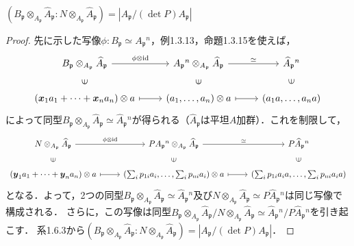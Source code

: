 \begin{screen}
  $(B_\mathfrak{p}\otimes_{A_\mathfrak{p}}\widehat{A}_\mathfrak{p}:N\otimes_{A_\mathfrak{p}}\widehat{A}_\mathfrak{p}) = |A_\mathfrak{p}/(\det P)A_\mathfrak{p}|$
\end{screen}
\begin{proof}
  先に示した写像$\phi\colon B_\mathfrak{p}\simeq A_\mathfrak{p}{}^n$，例1.3.13，命題1.3.15を使えば，
  \[
  \begin{tikzcd}
    B_\mathfrak{p}\otimes_{A_\mathfrak{p}}\widehat{A}_\mathfrak{p} \arrow[r, "\phi\otimes\id"]\arrow[d, phantom, "\ni" sloped] & A_\mathfrak{p}{}^n\otimes_{A_\mathfrak{p}}\widehat{A}_\mathfrak{p} \arrow[r, "\simeq"]\arrow[d, phantom, "\ni" sloped] & \widehat{A}_\mathfrak{p}{}^n \arrow[d, phantom, "\ni" sloped] \\
    (\boldsymbol{x}_1a_1 + \cdots + \boldsymbol{x}_na_n)\otimes a \arrow[r, mapsto] & (a_1, \ldots, a_n)\otimes a \arrow[r, mapsto] & (a_1a, \ldots, a_na)
  \end{tikzcd}
  \]
  によって同型$B_\mathfrak{p}\otimes_{A_\mathfrak{p}}\widehat{A}_\mathfrak{p}\simeq \widehat{A}_\mathfrak{p}{}^n$が得られる（$\widehat{A}_\mathfrak{p}$は平坦$A$加群）．これを制限して，
  \[
  \begin{tikzcd}
    N\otimes_{A_\mathfrak{p}}\widehat{A}_\mathfrak{p} \arrow[r, "\phi\otimes\id"]\arrow[d, phantom, "\ni" sloped] & PA_\mathfrak{p}{}^n\otimes_{A_\mathfrak{p}}\widehat{A}_\mathfrak{p} \arrow[r, "\simeq"]\arrow[d, phantom, "\ni" sloped] & P\widehat{A}_\mathfrak{p}{}^n \arrow[d, phantom, "\ni" sloped] \\
    (\boldsymbol{y}_1a_1 + \cdots + \boldsymbol{y}_na_n)\otimes a \arrow[r, mapsto] & \left(\sum_ip_{1i}a_i, \ldots, \sum_ip_{ni}a_i\right)\otimes a \arrow[r, mapsto] & \left(\sum_ip_{1i}a_ia, \ldots, \sum_ip_{ni}a_ia\right)
  \end{tikzcd}
  \]
  となる．よって，2つの同型$B_\mathfrak{p}\otimes_{A_\mathfrak{p}}\widehat{A}_\mathfrak{p}\simeq\widehat{A}_\mathfrak{p}{}^n$及び$N\otimes_{A_\mathfrak{p}}\widehat{A}_\mathfrak{p}\simeq P\widehat{A}_\mathfrak{p}{}^n$は同じ写像で構成される．
  さらに，この写像は同型$B_\mathfrak{p}\otimes_{A_\mathfrak{p}}\widehat{A}_\mathfrak{p}/N\otimes_{A_\mathfrak{p}}\widehat{A}_\mathfrak{p}\simeq\widehat{A}_\mathfrak{p}{}^n/P\widehat{A}_\mathfrak{p}{}^n$を引き起こす．
  系1.6.3から$(B_\mathfrak{p}\otimes_{A_\mathfrak{p}}\widehat{A}_\mathfrak{p}:N\otimes_{A_\mathfrak{p}}\widehat{A}_\mathfrak{p}) = |A_\mathfrak{p}/(\det P)A_\mathfrak{p}|$．
\end{proof}


